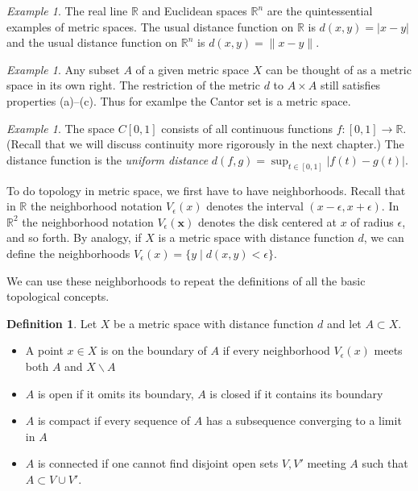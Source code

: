 \documentclass[11pt,oneside]{amsbook}
\newcommand{\R}{\mathbb R}
\renewcommand{\setminus}{\smallsetminus}
\theoremstyle{definition}
\theoremstyle{plain}
\theoremstyle{definition}
\newtheorem{defn}[thm]{Definition}
\theoremstyle{remark}
\newtheorem{example}[thm]{Example}
\numberwithin{equation}{section}
\numberwithin{figure}{section}
\begin{document}
\begin{example}
  The real line $\R$ and Euclidean spaces $\R^n$ are the quintessential examples of metric spaces. The usual distance function on $\R$ is $d(x,y)=|x-y|$ and the usual distance function on $\R^n$ is $d(x,y)=\|x-y\|$.
\end{example}

\begin{example}
  Any subset $A$ of a given metric space $X$ can be thought of as a metric space in its own right. The restriction of the metric $d$ to $A\times A$ still satisfies properties (a)--(c). Thus for examlpe the Cantor set is a metric space.
\end{example}

\begin{example}
  The space $C[0,1]$ consists of all continuous functions $f\colon[0,1]\to\R$. (Recall that we will discuss continuity more rigorously in the next chapter.) The distance function is the \emph{uniform distance} $d(f,g)=\sup_{t\in[0,1]}|f(t)-g(t)|$.
\end{example}

To do topology in metric space, we first have to have neighborhoods. Recall that in $\R$ the neighborhood notation $V_\epsilon(x)$ denotes the interval $(x-\epsilon,x+\epsilon)$. In $\R^2$ the neighborhood notation $V_\epsilon(\mathbf{x})$ denotes the disk centered at $x$ of radius $\epsilon$, and so forth. By analogy, if $X$ is a metric space with distance function $d$, we can define the neighborhoods $V_\epsilon(x)=\{y\mid d(x,y)<\epsilon\}$.

We can use these neighborhoods to repeat the definitions of all the basic topological concepts.

\begin{defn}
  Let $X$ be a metric space with distance function $d$ and let $A\subset X$.
  \begin{itemize}
  \item A point $x\in X$ is on the boundary of $A$ if every neighborhood $V_\epsilon(x)$ meets both $A$ and $X\setminus A$
  \item $A$ is open if it omits its boundary, $A$ is closed if it contains its boundary
  \item $A$ is compact if every sequence of $A$ has a subsequence converging to a limit in $A$
  \item $A$ is connected if one cannot find disjoint open sets $V,V'$ meeting $A$ such that $A\subset V\cup V'$.
  \end{itemize}
\end{defn}
\end{document}
